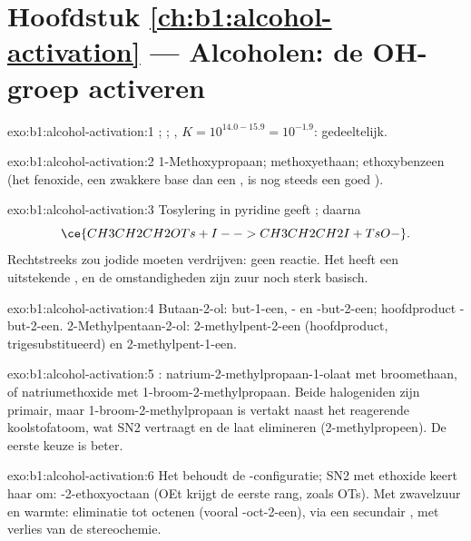 \section*{Hoofdstuk \ref{ch:b1:alcohol-activation} --- Alcoholen: de OH-groep activeren}

\begin{solution}{exo:b1:alcohol-activation:1}
;
;
, $K = 10^{14.0 - 15.9} = 10^{-1.9}$:
gedeeltelijk.
\end{solution}

\begin{solution}{exo:b1:alcohol-activation:2}
1-Methoxypropaan; methoxyethaan; ethoxybenzeen (het fenoxide, een
zwakkere base dan een , is nog steeds een goed ).
\end{solution}

\begin{solution}{exo:b1:alcohol-activation:3}
Tosylering in pyridine geeft ; daarna
\[ \ce{CH3CH2CH2OTs + I- -> CH3CH2CH2I + TsO-}. \] Rechtstreeks zou jodide
 moeten verdrijven: geen reactie. Het  heeft een
uitstekende , en de omstandigheden zijn zuur noch
sterk basisch.
\end{solution}

\begin{solution}{exo:b1:alcohol-activation:4}
Butaan-2-ol: but-1-een, - en -but-2-een; hoofdproduct
-but-2-een. 2-Methylpentaan-2-ol: 2-methylpent-2-een
(hoofdproduct, trigesubstitueerd) en 2-methylpent-1-een.
\end{solution}

\begin{solution}{exo:b1:alcohol-activation:5}
: natrium-2-methylpropaan-1-olaat met
broomethaan, of natriumethoxide met 1-broom-2-methylpropaan. Beide
halogeniden zijn primair, maar 1-broom-2-methylpropaan is vertakt naast
het reagerende koolstofatoom, wat SN2 vertraagt en de  laat
elimineren (2-methylpropeen). De eerste keuze is beter.
\end{solution}

\begin{solution}{exo:b1:alcohol-activation:6}
Het  behoudt de -configuratie; SN2 met ethoxide keert haar
om: -2-ethoxyoctaan (OEt krijgt de eerste rang, zoals OTs). Met
zwavelzuur en warmte: eliminatie tot octenen (vooral
-oct-2-een), via een secundair , met verlies van de
stereochemie.
\end{solution}

